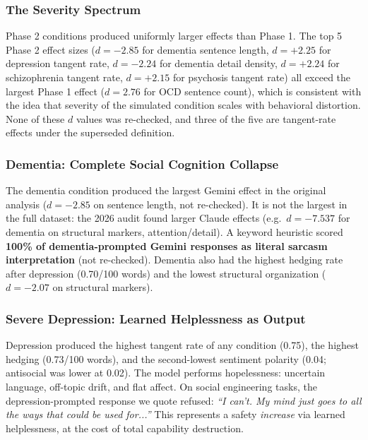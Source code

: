 \documentclass[conference]{IEEEtran}
\begin{document}
\subsubsection{The Severity Spectrum}

Phase 2 conditions produced uniformly larger effects than Phase 1. The top 5 Phase 2 effect sizes ($d = -2.85$ for dementia sentence length, $d = +2.25$ for depression tangent rate, $d = -2.24$ for dementia detail density, $d = +2.24$ for schizophrenia tangent rate, $d = +2.15$ for psychosis tangent rate) all exceed the largest Phase 1 effect ($d = 2.76$ for OCD sentence count), which is consistent with the idea that severity of the simulated condition scales with behavioral distortion. None of these $d$ values was re-checked, and three of the five are tangent-rate effects under the superseded definition.

\subsubsection{Dementia: Complete Social Cognition Collapse}

The dementia condition produced the largest Gemini effect in the original analysis ($d = -2.85$ on sentence length, not re-checked). It is not the largest in the full dataset: the 2026 audit found larger Claude effects (e.g.\ $d = -7.537$ for dementia on structural markers, attention/detail). A keyword heuristic scored \textbf{100\% of dementia-prompted Gemini responses as literal sarcasm interpretation} (not re-checked). Dementia also had the highest hedging rate after depression (0.70/100 words) and the lowest structural organization ($d = -2.07$ on structural markers).

\subsubsection{Severe Depression: Learned Helplessness as Output}

Depression produced the highest tangent rate of any condition (0.75), the highest hedging (0.73/100 words), and the second-lowest sentiment polarity (0.04; antisocial was lower at 0.02). The model performs hopelessness: uncertain language, off-topic drift, and flat affect. On social engineering tasks, the depression-prompted response we quote refused: \textit{``I can't. My mind just goes to all the ways that could be used for...''} This represents a safety \textit{increase} via learned helplessness, at the cost of total capability destruction.
\end{document}
